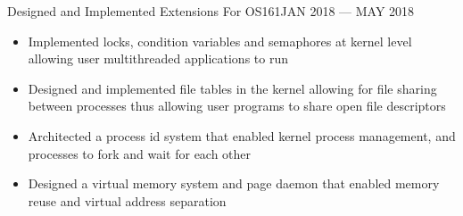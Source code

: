 \begin{projects}
    \project
    {Designed and Implemented Extensions For OS161}{JAN 2018 --- MAY 2018}{}{
        \begin{itemize}
        \item Implemented locks, condition variables and semaphores at kernel level allowing user
              multithreaded applications to run
        \item Designed and implemented file tables in the kernel allowing for file sharing between
              processes thus allowing user programs to share open file descriptors
        \item Architected a process id system that enabled kernel process management, and
              processes to fork and wait for each other
        \item Designed a virtual memory system and page daemon that enabled memory reuse and virtual
              address separation
        \end{itemize}
    }

\end{projects}
